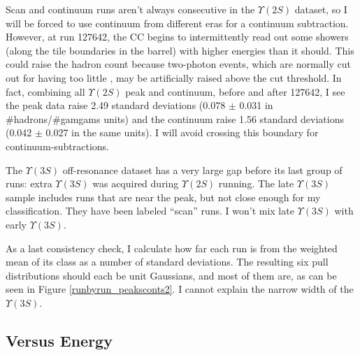 Scan and continuum runs aren't always consecutive in the
$\Upsilon(2S)$ dataset, so I will be forced to use continuum from
different eras for a continuum subtraction.  However, at run 127642,
the CC begins to intermittently read out some showers (along the tile
boundaries in the barrel) with higher energies than it should.  This
could raise the hadron count because two-photon events, which are
normally cut out for having too little \visen, may be artificially
raised above the cut threshold.  In fact, combining all $\Upsilon(2S)$
peak and continuum, before and after 127642, I see the peak data raise
2.49 standard deviations (0.078 $\pm$ 0.031 in \#hadrons/\#gamgams
units) and the continuum raise 1.56 standard deviations (0.042 $\pm$
0.027 in the same units).  I will avoid crossing this boundary for
continuum-subtractions.





The $\Upsilon(3S)$ off-resonance dataset has a very large gap before
its last group of runs: extra $\Upsilon(3S)$ was acquired during
$\Upsilon(2S)$ running.  The late $\Upsilon(3S)$ sample includes runs
that are near the peak, but not close enough for my classification.
They have been labeled ``scan'' runs.  I won't mix late $\Upsilon(3S)$
with early $\Upsilon(3S)$.

As a last consistency check, I calculate how far each run is from the
weighted mean of its class as a number of standard deviations.  The
resulting six pull distributions should each be unit Gaussians, and
most of them are, as can be seen in Figure \ref{runbyrun_peaksconts2}.
I cannot explain the narrow width of the $\Upsilon(3S)$.

\subsection{Versus Energy} \label{runbyrun_ssecvsenergy}

